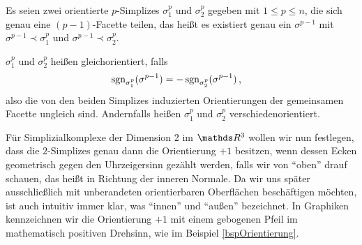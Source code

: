     \begin{definition}
      Es seien zwei orientierte \( p \)-Simplizes \( \sigma^{p}_{1} \) und \( \sigma^{p}_{2} \) gegeben mit 
      \mbox{\( 1 \le p \le n \)}, 
      die sich genau eine \( (p-1) \)-Facette teilen, das heißt es existiert genau ein \( \sigma^{p-1} \) mit 
      \( \sigma^{p-1} \prec \sigma^{p}_{1} \) und \( \sigma^{p-1} \prec \sigma^{p}_{2} \).

      \( \sigma^{p}_{1} \) und \( \sigma^{p}_{2} \) heißen gleichorientiert, falls
      \begin{align}
        \mathop{\mathrm{sgn}}\nolimits_{\sigma^{p}_{1}}(\sigma^{p-1}) &= - \mathop{\mathrm{sgn}}\nolimits_{\sigma^{p}_{2}}(\sigma^{p-1}) \,\text{,}
      \end{align}
      also die von den beiden Simplizes induzierten Orientierungen der gemeinsamen Facette ungleich sind.
      Andernfalls heißen \( \sigma^{p}_{1} \) und \( \sigma^{p}_{2} \) verschiedenorientiert.
    \end{definition}

    \begin{bemerkung}
      Für Simplizialkomplexe der Dimension 2 im \( \R^{3} \) wollen wir nun festlegen, dass die \( 2 \)-Simplizes genau dann 
      die Orientierung \( +1 \)
      besitzen, wenn dessen Ecken geometrisch gegen den Uhrzeigersinn gezählt werden, falls wir von "`oben"' drauf schauen,
      das heißt in Richtung der inneren Normale.
      Da wir uns später ausschließlich mit unberandeten orientierbaren Oberflächen beschäftigen möchten, ist auch intuitiv immer klar, was "`innen"' und
      "`außen"' bezeichnet.
      In Graphiken kennzeichnen wir die Orientierung \( +1 \) mit einem gebogenen Pfeil im mathematisch positiven Drehsinn, wie im Beispiel
      \ref{bspOrientierung}.
    \end{bemerkung}

